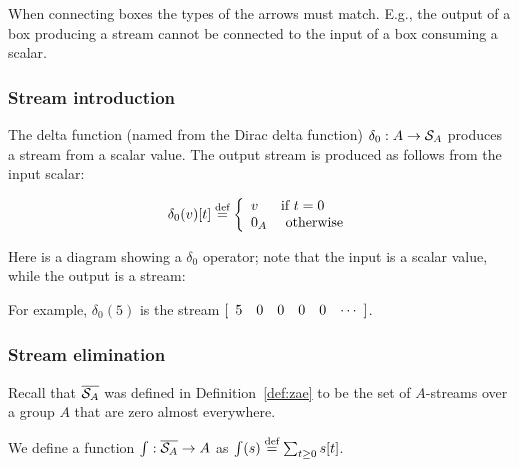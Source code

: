 When connecting boxes the types of the arrows must match.  E.g.,
the output of a box producing a stream cannot be connected to the
input of a box consuming a scalar.

\subsubsection{Stream introduction}\label{sec:stream-introduction}

\begin{definition}
The delta function (named from the Dirac delta function) $\delta_0 : A \rightarrow \mathcal{S}_{A}$
produces a stream from a scalar value.  
The output stream is produced as follows from the input scalar:

$$\delta_0(v)[t] \stackrel{\textrm{\scriptsize def}}{=} \left\{
\begin{array}{ll}
  v & \mbox{if } t = 0 \\
  0_A & \mbox{ otherwise}
\end{array}
\right.
$$
\end{definition}

Here is a diagram showing a $\delta_0$ operator; note that the input is a scalar value,
while the output is a stream:  

\begin{center}
\end{center}

For example, $\delta_0(5)$ is the stream $\sv{5 0 0 0 0}$.

\subsubsection{Stream elimination}\label{sec:stream-elimination}

Recall that $\overline{\mathcal{S}_{A}}$ was defined in Definition~\ref{def:zae} to be the set of 
$A$-streams over a group $A$ that are zero almost everywhere. 

\begin{definition}
We define a function $\int : \overline{\mathcal{S}_{A}} \rightarrow
A$ as $\int(s) \stackrel{\textrm{\scriptsize def}}{=} \sum_{t \geq 0} s[t]$.
\end{definition}

